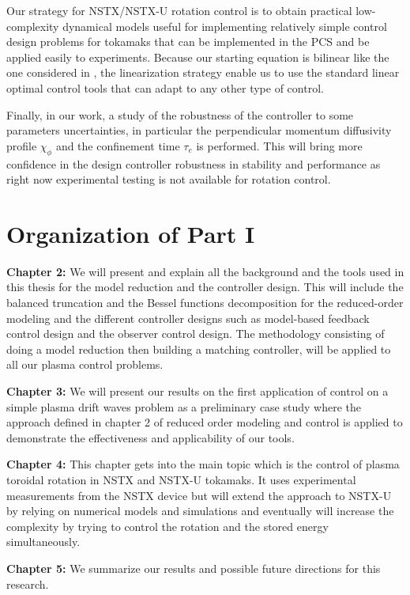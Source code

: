 \documentclass[12pt,lot, lof]{puthesis}
\begin{document}
Our strategy for NSTX/NSTX-U rotation control is to obtain practical low-complexity dynamical models useful for implementing relatively simple control design problems for tokamaks that can be implemented in the PCS and be applied easily to experiments. Because our starting equation is bilinear like the one considered in \cite{Xu11}, the linearization strategy enable us to use the standard linear optimal control tools that can adapt to any other type of control.

Finally, in our work, a study of the robustness of the controller to some parameters uncertainties, in particular the perpendicular momentum diffusivity profile $\chi_{\phi}$ and the confinement time $\tau_e$  is performed. This will bring more confidence in the design controller robustness in stability and performance as right now experimental testing is not available for rotation control.

\section{Organization of Part I}

{\bf{Chapter 2:}} We will present and explain all the background and  the tools used in this thesis for the model reduction and the controller design. This will include the balanced truncation and the Bessel functions decomposition for the reduced-order modeling and the different controller designs such as model-based feedback control design and the observer control design. The methodology consisting of doing a model reduction then building a matching controller, will be applied to all our plasma control problems.

{\bf{Chapter 3:}} We will present our results on the first application of control on a simple plasma drift waves problem as a preliminary case study where the approach defined in chapter 2 of reduced order modeling and control is applied to demonstrate the effectiveness and applicability of our tools.

{\bf{Chapter 4:}}  This chapter gets into the main topic which is the control of plasma toroidal rotation in NSTX  and NSTX-U tokamaks.
It uses experimental measurements from the NSTX device but will extend the approach to NSTX-U by relying on numerical models and  simulations and eventually will increase the complexity by trying to control the rotation and the stored energy simultaneously.

{\bf{Chapter 5:}} We summarize our results and possible future directions for this research.
\end{document}
